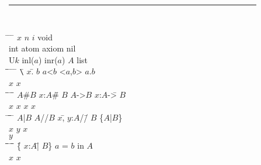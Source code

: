 \begin{figure}
\hrule{}
\vspace{2ex}
\tt
\newcommand{\parg}{{\tiny{$\wedge$}}}
\newcommand{\bvx}{{\small{$x$}}}
\newcommand{\bvy}{{\small{$y$}}}
\newcommand{\bvu}{{\small{$u$}}}
\newcommand{\bvv}{{\small{$v$}}}
\newcommand{\wide}[1]{\multicolumn{2}{l}{#1}}
\begin{minipage}{\hsize}
\begin{tabbing}
\hspace{1in} 	\= \hspace{1in}	\= \hspace{1in}	\=		\kill
$x$		\> $n$		\> $i$		\> void		\\[1ex]
int		\> atom		\> axiom	\> nil		\\[1ex] 
U$k$		\> inl($a$)	\> inr($a$)	\> $A$ list	\\[1ex] 
\= \= \hspace{1in}
		\= \hspace{1in}	\= \hspace{1in}	\=		\kill
\verb+\+\= $x$.\= $b$
		\> $a$<$b$	\> <$a$,$b$>	\> $a$.$b$	\\[-.6ex]
	\> \bvx	\> \bvx						\\[1ex] 
\hspace{1in} 	\= \= \hspace{1in}
				\= \hspace{1in}	\= \= 
							\kill
$A$\#$B$	\> $x$:$A$\#\= $B$
				\> $A$->$B$	\> $x$:$A$->\= $B$
								\\[-.6ex]
		\> \bvx	    \> \bvx
				\>		\> \bvx	    \> \bvx \\[1ex] 
\hspace{1in} 	\= \hspace{1in}
				\= \= \= \hspace{1in}	\= 
								\kill
$A$|$B$ \> $A$//$B$	\> $x$,\= $y$:$A$//\= $B$
				\> \{$A$|$B$\}									\\[-.6ex]
	\> \> \bvx
		       \> \bvy     \> \bvx  \\[-1.5ex]
	\>	\>	\>	   \> \bvy  \\[1ex]
\hspace{1in} 	\= \= \= \hspace{1in}
				\= \hspace{1in}	\= \= \=
								\kill
	 \{\= $x$:$A$|\= $B$\} \> $a$ = $b$ in $A$\\[-.6ex]
 \> \bvx    \> \bvx \\[1ex]


\end{tabbing}
\end{minipage}
\end{figure}
